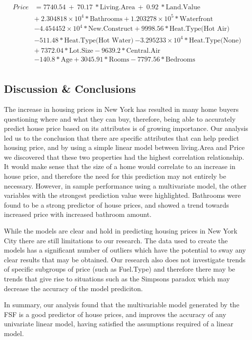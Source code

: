 \documentclass[letterpaper,9pt,twocolumn,twoside,]{pinp}
\begin{document}
\begin{equation}
  \begin{aligned}
Price&=7740.54\ +\ 70.17\ * \text{Living.Area}\ +\ 0.92\ * \text{Land.Value} \\
&+\ \ensuremath{2.304818\times 10^{4}} * \text{Bathrooms} + \ensuremath{1.203278\times 10^{5}} * \text{Waterfront}\   \\
& \ensuremath{-4.454452\times 10^{4}} * \text{New.Construct} + 9998.56 * \text{Heat.Type(Hot Air)}\ \\
& -511.48 * \text{Heat.Type(Hot Water)}\ \ensuremath{-3.295233\times 10^{4}} * \text{Heat.Type(None)}\\
&+\ 7372.04 * \text{Lot.Size} - 9639.2 * \text{Central.Air}\\
& -140.8 * \text{Age} + 3045.91 * \text{Rooms}  -7797.56 * \text{Bedrooms}\\
       \label{eqn:example}
  \end{aligned}
\end{equation}

\hypertarget{discussion-conclusions}{%
\subsection{Discussion \& Conclusions}\label{discussion-conclusions}}

The increase in housing prices in New York has resulted in many home
buyers questioning where and what they can buy, therefore, being able to
accurately predict house price based on its attributes is of growing
importance. Our analysis led us to the conclusion that there are
specific attributes that can help predict housing price, and by using a
simple linear model between living.Area and Price we discovered that
these two properties had the highest correlation relationship. It would
make sense that the size of a home would correlate to an increase in
house price, and therefore the need for this prediction may not entirely
be necessary. However, in sample performance using a multivariate model,
the other variables with the strongest prediction value were
highlighted. Bathrooms were found to be a strong predictor of house
prices, and showed a trend towards increased price with increased
bathroom amount.

While the models are clear and hold in predicting housing prices in New
York City there are still limitations to our research. The data used to
create the models has a significant number of outliers which have the
potential to sway any clear results that may be obtained. Our research
also does not investigate trends of specific subgroups of price (such as
Fuel.Type) and therefore there may be trends that give rise to
situations such as the Simpsons paradox which may decrease the accuracy
of the model prediciton.

In summary, our analysis found that the multivariable model generated by
the FSF is a good predictor of house prices, and improves the accuracy
of any univariate linear model, having satisfied the assumptions
required of a linear model.





\end{document}
